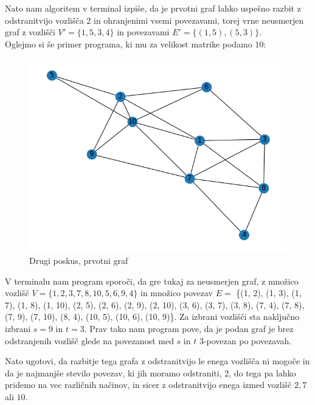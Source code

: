 \documentclass[a4paper,12pt]{article}
\theoremstyle{definition}
\begin{document}
Nato nam algoritem v terminal izpiše, da je prvotni graf lahko uspešno razbit z 
odstranitvijo vozlišča 2 in ohranjenimi vsemi povezavami,
torej vrne neusmerjen graf z vozlišči $V' = \{1, 5, 3, 4\}$ in povezavami $E' = \{(1, 5), (5, 3)\}$.\\

Oglejmo si še primer programa, ki mu za velikost matrike podamo $10$:

\begin{figure}[H]
	\caption{Drugi poskus, prvotni graf}
	\centering
	\includegraphics[scale=0.4]{slikovni_prikaz/Figure_2_0}
\end{figure}

V terminalu nam program sporoči, da gre tukaj za neusmerjen graf, 
z množico vozlišč $V = \{1, 2, 3, 7, 8, 10, 5, 6, 9, 4\}$ in množico povezav 
$E =$ \{(1, 2), (1, 3), (1, 7), (1, 8), (1, 10), (2, 5), (2, 6), (2, 9), (2, 10), (3, 6), (3, 7), (3, 8), (7, 4), (7, 8), (7, 9), (7, 10), (8, 4), (10, 5), (10, 6), (10, 9)\}.
Za izbrani vozlišči sta naključno izbrani $s = 9$ in $t = 3$. 
Prav tako nam program pove, da je podan graf je brez odstranjenih vozlišč
glede na povezanost med $s$ in $t$ 3-povezan po povezavah.

Nato ugotovi, da razbitje tega grafa z odstranitvijo le enega vozlišča
ni mogoče in da je najmanjše stevilo povezav, ki jih moramo odstraniti, 2, 
do tega pa lahko pridemo na vec različnih načinov, in sicer z odstranitvijo enega
izmed vozlišč $2, 7$ ali $10$.
\end{document}
